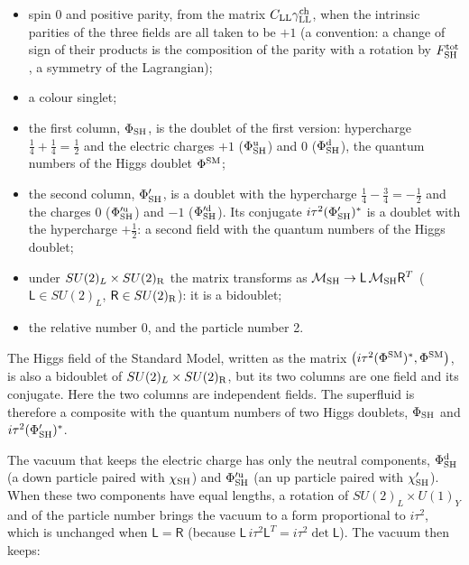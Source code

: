 \documentclass[
  10pt,
]{article}
\providecommand{\tightlist}{%
  \setlength{\itemsep}{0pt}\setlength{\parskip}{0pt}}
\begin{document}
\begin{itemize}
\tightlist
\item
  spin 0 and positive parity, from the matrix
  \(C_{\rm LL}\gamma^{\rm ch}_{\rm LL}\), when the intrinsic parities of
  the three fields are all taken to be \(+1\) (a convention: a change of
  sign of their products is the composition of the parity with a
  rotation by \(F^{\rm tot}_{\rm SH}\), a symmetry of the Lagrangian);
\item
  a colour singlet;
\item
  the first column, \(\Phi_{\rm SH}\), is the doublet of the first
  version: hypercharge \(\tfrac14+\tfrac14=\tfrac12\) and the electric
  charges \(+1\) (\(\Phi^{\rm u}_{\rm SH}\)) and 0
  (\(\Phi^{\rm d}_{\rm SH}\)), the quantum numbers of the Higgs doublet
  \(\Phi^{\rm SM}\);
\item
  the second column, \(\Phi'_{\rm SH}\), is a doublet with the
  hypercharge \(\tfrac14-\tfrac34=-\tfrac12\) and the charges 0
  (\(\Phi'^{\rm u}_{\rm SH}\)) and \(-1\) (\(\Phi'^{\rm d}_{\rm SH}\)).
  Its conjugate \(i\tau^2(\Phi'_{\rm SH})^*\) is a doublet with the
  hypercharge \(+\tfrac12\): a second field with the quantum numbers of
  the Higgs doublet;
\item
  under \(SU(2)_L\times SU(2)_{\rm R}\) the matrix transforms as
  \(\mathcal M_{\rm SH}\to\mathsf L\,\mathcal M_{\rm SH}\mathsf R^T\)
  (\(\mathsf L\in SU(2)_L\), \(\mathsf R\in SU(2)_{\rm R}\)): it is a
  bidoublet;
\item
  the relative number 0, and the particle number 2.
\end{itemize}

The Higgs field of the Standard Model, written as the matrix
\(\big(i\tau^2(\Phi^{\rm SM})^*,\Phi^{\rm SM}\big)\), is also a
bidoublet of \(SU(2)_L\times SU(2)_{\rm R}\), but its two columns are
one field and its conjugate. Here the two columns are independent
fields. The superfluid is therefore a composite with the quantum numbers
of two Higgs doublets, \(\Phi_{\rm SH}\) and
\(i\tau^2(\Phi'_{\rm SH})^*\).

The vacuum that keeps the electric charge has only the neutral
components, \(\Phi^{\rm d}_{\rm SH}\) (a down particle paired with
\(\chi_{\rm SH}\)) and \(\Phi'^{\rm u}_{\rm SH}\) (an up particle paired
with \(\chi'_{\rm SH}\)). When these two components have equal lengths,
a rotation of \(SU(2)_L\times U(1)_Y\) and of the particle number brings
the vacuum to a form proportional to \(i\tau^2\), which is unchanged
when \(\mathsf L=\mathsf R\) (because
\(\mathsf L\,i\tau^2\mathsf L^T=i\tau^2\det\mathsf L\)). The vacuum then
keeps:
\end{document}
